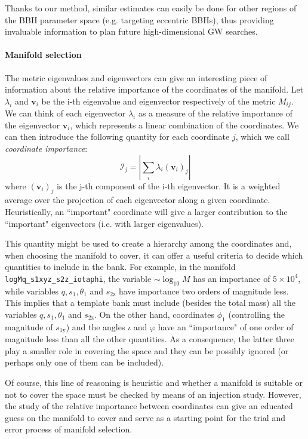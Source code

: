 \documentclass[twocolumn,showpacs,preprintnumbers,nofootinbib,prd,
superscriptaddress,10pt]{revtex4-2}
\begin{document}
Thanks to our method, similar estimates can easily be done for other regions of the BBH parameter space (e.g. targeting eccentric BBHs), thus providing invaluable information to plan future high-dimensional GW searches.

\paragraph{Manifold selection}\label{par:manifold_selection}

The metric eigenvalues and eigenvectors can give an interesting piece of information about the relative importance of the coordinates of the manifold.
Let $\lambda_i$ and $\mathbf{v}_i$ be the i-th eigenvalue and eigenvector respectively of the metric $M_{ij}$.
We can think of each eigenvector $\lambda_i$ as a measure of the relative importance of the eigenvector $\mathbf{v}_i$, which represents a linear combination of the coordinates.
We can then introduce the following quantity for each coordinate $j$, which we call {\it coordinate importance}:
\begin{equation}
\mathcal{I}_j = \left| \sum_i \lambda_i (\mathbf{v}_i)_j \right|
\end{equation}
where $(\mathbf{v}_i)_j$ is the j-th component of the i-th eigenvector.
It is a weighted average over the projection of each eigenvector along a given coordinate. Heuristically, an ``important" coordinate will give a larger contribution to the ``important" eigenvectors (i.e. with larger eigenvalues).

This quantity might be used to create a hierarchy among the coordinates and, when choosing the manifold to cover, it can offer a useful criteria to decide which quantities to include in the bank.
For example, in the manifold \texttt{logMq\_s1xyz\_s2z\_iotaphi}, the variable $\sim \log_{10}M$ has an importance of $5\times 10^4$, while variables $q, s_1, \theta_1$ and $s_\text{2z}$ have importance two orders of magnitude less. This implies that a template bank must include (besides the total mass) all the variables $q, s_1, \theta_1$ and $s_\text{2z}$.
On the other hand, coordinates $\phi_1$ (controlling the magnitude of $s_\text{1y}$) and the angles $\iota$ and $\varphi$ have an ``importance" of one order of magnitude less than all the other quantities. As a consequence, the latter three play a smaller role in covering the space and they can be possibly ignored (or perhaps only one of them can be included).

Of course, this line of reasoning is heuristic and whether a manifold is suitable or not to cover the space must be checked by means of an injection study. However, the study of the relative importance between coordinates can give an educated guess on the manifold to cover and serve as a starting point for the trial and error process of manifold selection.
\end{document}
